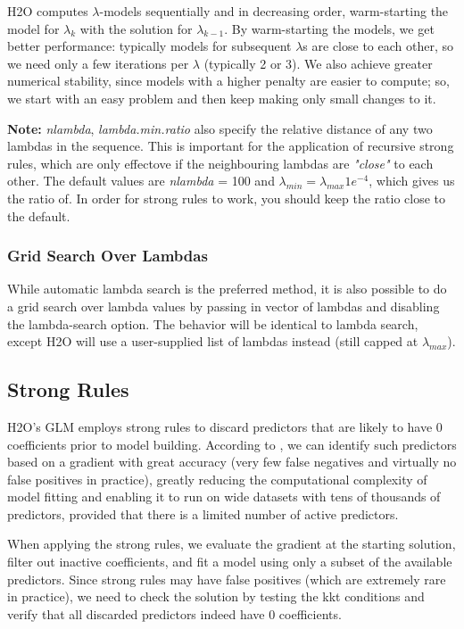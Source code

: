 \documentclass[11pt]{article}
\begin{document}
H2O computes $\lambda$-models sequentially and in decreasing order, warm-starting the model for $\lambda_k$ with the solution for $\lambda_{k-1}$. By warm-starting the models, we get better performance: typically models for subsequent $\lambda$s are close to each other, so we need only a few iterations per $\lambda$ (typically 2 or 3). We also achieve greater numerical stability, since models with a higher penalty are easier to compute; so, we start with an easy problem and then keep making only small changes to it.

\textbf{Note:} \textit{nlambda}, \textit{lambda.min.ratio} also specify the relative distance of any two lambdas in the sequence. This is important for the application of recursive strong rules, which are only effectove if the neighbouring lambdas are \textit{"close"} to each other. The default values are \textit{nlambda} = 100 and $\lambda_{min} = \lambda_{max} 1e^{-4}$, which gives us the ratio of.   In order for strong rules to work, you should keep the ratio close to the default.  
    
\subsubsection{Grid Search Over Lambdas}
While automatic lambda search is the preferred method, it is also possible to do a grid search over lambda values by passing in vector of lambdas and disabling the lambda-search option. The behavior will be identical to lambda search, except H2O will use a user-supplied list of lambdas instead (still capped at $\lambda_{max}$).

\subsection{Strong Rules} %
H2O's GLM employs strong rules \cite{strong} to discard predictors that are likely to have 0 coefficients prior to model building. According to \cite{strong}, we can identify such predictors based on a gradient with great accuracy (very few false negatives and virtually no false positives in practice), greatly reducing the computational complexity of model fitting and enabling it to run on wide datasets with tens of thousands of predictors, provided that there is a limited number of active predictors. 

When applying the strong rules, we evaluate the gradient at the starting solution, filter out inactive coefficients, and fit a model using only a subset of the available predictors. Since strong rules may have false positives (which are extremely rare in practice), we need to check the solution by testing the kkt conditions and verify that all discarded predictors indeed have 0 coefficients.  
\end{document}

